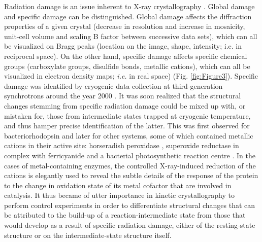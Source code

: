 Radiation damage is an issue inherent to X-ray crystallography \parencite{garmanRadiationDamageMacromolecular2010}. Global damage and specific damage can be distinguished. Global damage affects the diffraction properties of a given crystal (decrease in resolution and increase in mosaicity, unit-cell volume and scaling B factor between successive data sets), which can all be visualized on Bragg peaks (location on the image, shape, intensity; i.e. in reciprocal space). On the other hand, specific damage affects specific chemical groups (carboxylate groups, disulfide bonds, metallic cations), which can all be visualized in electron density maps; \textit{i.e.} in real space) (Fig. \ref{fig:Figure3}). Specific damage was identified by cryogenic data collection at third-generation synchrotrons around the year 2000 \parencite{burmeisterStructuralChangesCryocooled2000,weikSpecificChemicalStructural2000,ravelliFingerprintThatXrays2000}. It was soon realized that the structural changes stemming from specific radiation damage could be mixed up with, or mistaken for, those from intermediate states trapped at cryogenic temperature, and thus hamper precise identification of the latter. This was first observed for bacteriorhodopsin \parencite{matsuiSpecificDamageInduced2002} and later for other systems, some of which contained metallic cations in their active site: horseradish peroxidase \parencite{berglundCatalyticPathwayHorseradish2002}, superoxide reductase in complex with ferricyanide \parencite{adamStructureSuperoxideReductase2004} and a bacterial photosynthetic reaction centre \parencite{baxterSpecificRadiationDamage2004}. In the cases of metal-containing enzymes, the controlled X-ray-induced reduction of the cations is elegantly used to reveal the subtle details of the response of the protein to the change in oxidation state of its metal cofactor that are involved in catalysis. It thus became of utter importance in kinetic crystallography to perform control experiments in order to differentiate structural changes that can be attributed to the build-up of a reaction-intermediate state from those that would develop as a result of specific radiation damage, either of the resting-state structure or on the intermediate-state structure itself.

